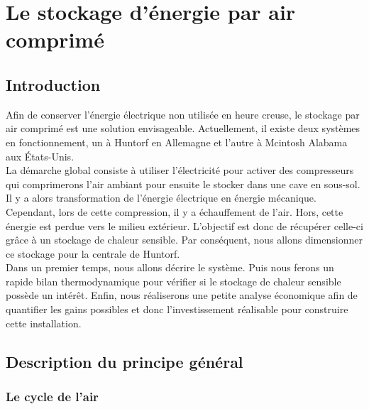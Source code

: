 \chapter{Le stockage d'énergie par air comprimé}

\section{Introduction}

Afin de conserver l'énergie électrique non utilisée en heure creuse, le stockage par air comprimé est une solution envisageable. Actuellement, il existe deux systèmes en fonctionnement, un à Huntorf en Allemagne et l'autre à Mcintosh Alabama aux États-Unis.\\

La démarche global consiste à utiliser l'électricité pour activer des compresseurs qui comprimerons l'air ambiant pour ensuite le stocker dans une cave en sous-sol. Il y a alors transformation de l'énergie électrique en énergie mécanique. Cependant, lors de cette compression, il y a échauffement de l'air. Hors, cette énergie est perdue vers le milieu extérieur. L'objectif est donc de récupérer celle-ci grâce à un stockage de chaleur sensible. Par conséquent, nous allons dimensionner ce stockage pour la centrale de Huntorf. \\

Dans un premier temps, nous allons décrire le système. Puis nous ferons un rapide bilan thermodynamique pour vérifier si le stockage de chaleur sensible possède un intérêt. Enfin, nous réaliserons une petite analyse économique afin de quantifier les gains possibles et donc l'investissement réalisable pour construire cette installation.
\newpage

\section{Description du principe général}

\subsection{Le cycle de l'air}

